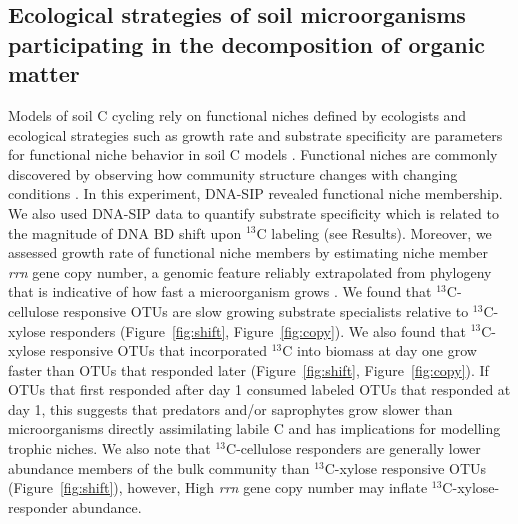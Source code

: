 \subsection{Ecological strategies of soil microorganisms participating in the
decomposition of organic matter}
Models of soil C cycling rely on functional niches defined by ecologists and
ecological strategies such as growth rate and substrate specificity are
parameters for functional niche behavior in soil C models \citep{Kaiser2014a}.
Functional niches are commonly discovered by observing how community structure
changes with changing conditions \cite{Fierer2007}. In this experiment, DNA-SIP
revealed functional niche membership. We also used DNA-SIP data to quantify
substrate specificity which is related to the magnitude of DNA BD shift upon
$^{13}$C labeling (see Results). Moreover, we assessed growth rate of
functional niche members by estimating niche member \textit{rrn} gene copy
number, a genomic feature reliably extrapolated from phylogeny that is
indicative of how fast a microorganism grows \citep{11125085,Kembel_2012}. We
found that $^{13}$C-cellulose responsive OTUs are slow growing substrate
specialists relative to $^{13}$C-xylose responders (Figure~\ref{fig:shift},
Figure~\ref{fig:copy}). We also found that $^{13}$C-xylose responsive OTUs that
incorporated $^{13}$C into biomass at day one grow faster than OTUs that
responded later (Figure~\ref{fig:shift}, Figure~\ref{fig:copy}). If OTUs that
first responded after day 1 consumed labeled OTUs that responded at day 1, this
suggests that predators and/or saprophytes grow slower than microorganisms
directly assimilating labile C and has implications for modelling trophic
niches. We also note that $^{13}$C-cellulose responders are generally lower
abundance members of the bulk community than $^{13}$C-xylose responsive OTUs
(Figure~\ref{fig:shift}), however, High \textit{rrn} gene copy number may
inflate $^{13}$C-xylose-responder abundance.


